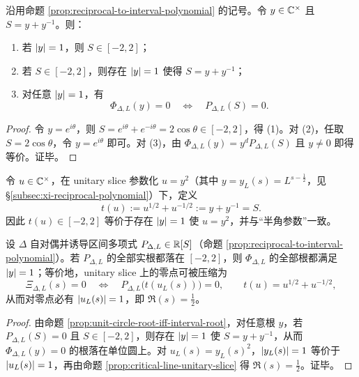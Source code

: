 \begin{proposition}\label{prop:unit-circle-root-iff-interval-root}
沿用命题 \ref{prop:reciprocal-to-interval-polynomial} 的记号。令 $y\in\mathbb{C}^\times$ 且 $S=y+y^{-1}$。则：
\begin{enumerate}
  \item 若 $\left\lvert y\right\rvert=1$，则 $S\in[-2,2]$；
  \item 若 $S\in[-2,2]$，则存在 $\left\lvert y\right\rvert=1$ 使得 $S=y+y^{-1}$；
  \item 对任意 $\left\lvert y\right\rvert=1$，有
  $$
  \Phi_{\Delta,L}(y)=0\quad\Longleftrightarrow\quad P_{\Delta,L}(S)=0.
  $$
\end{enumerate}
\end{proposition}
\begin{proof}
令 $y=e^{i\theta}$，则 $S=e^{i\theta}+e^{-i\theta}=2\cos\theta\in[-2,2]$，得 (1)。对 (2)，任取 $S=2\cos\theta$，令 $y=e^{i\theta}$ 即可。对 (3)，由 $\Phi_{\Delta,L}(y)=y^dP_{\Delta,L}(S)$ 且 $y\neq 0$ 即得等价。证毕。
\end{proof}

\begin{definition}\label{def:unitary-root-t}
令 $u\in\mathbb{C}^\times$，在 unitary slice 参数化 $u=y^2$（其中 $y=y_L(s)=L^{s-\frac12}$，见 \S\ref{subsec:xi-reciprocal-polynomial}）下，定义
$$
t(u):=u^{1/2}+u^{-1/2}:=y+y^{-1}=S.
$$
因此 $t(u)\in[-2,2]$ 等价于存在 $\left\lvert y\right\rvert=1$ 使 $u=y^2$，并与“半角参数”一致。
\end{definition}

\begin{theorem}\label{thm:unitary-root-criterion}
设 $\Delta$ 自对偶并诱导区间多项式 $P_{\Delta,L}\in\mathbb{R}[S]$（命题 \ref{prop:reciprocal-to-interval-polynomial}）。若 $P_{\Delta,L}$ 的全部实根都落在 $[-2,2]$，则 $\Phi_{\Delta,L}$ 的全部根都满足 $\left\lvert y\right\rvert=1$；等价地，unitary slice 上的零点可被压缩为
$$
\Xi_{\Delta,L}(s)=0\quad\Longleftrightarrow\quad P_{\Delta,L}\bigl(t(u_L(s))\bigr)=0,\qquad t(u)=u^{1/2}+u^{-1/2},
$$
从而对零点必有 $\left\lvert u_L(s)\right\rvert=1$，即 $\Re(s)=\tfrac12$。
\end{theorem}

\begin{proof}
由命题 \ref{prop:unit-circle-root-iff-interval-root}，对任意根 $y$，若 $P_{\Delta,L}(S)=0$ 且 $S\in[-2,2]$，则存在 $\left\lvert y\right\rvert=1$ 使 $S=y+y^{-1}$，从而 $\Phi_{\Delta,L}(y)=0$ 的根落在单位圆上。对 $u_L(s)=y_L(s)^2$，$\left\lvert y_L(s)\right\rvert=1$ 等价于 $\left\lvert u_L(s)\right\rvert=1$，再由命题 \ref{prop:critical-line-unitary-slice} 得 $\Re(s)=\tfrac12$。证毕。
\end{proof}

